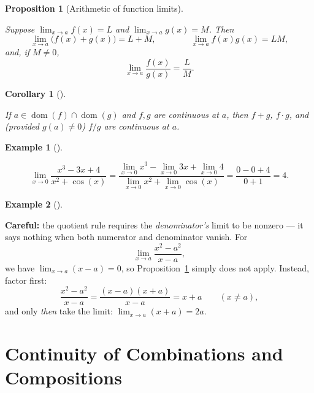 \documentclass[
  letterpaper,
  DIV=11,
  numbers=noendperiod]{scrreprt}
\theoremstyle{plain}
\theoremstyle{plain}
\newtheorem{proposition}{Proposition}[chapter]
\theoremstyle{definition}
\theoremstyle{definition}
\theoremstyle{definition}
\newtheorem{example}{Example}[chapter]
\theoremstyle{plain}
\theoremstyle{plain}
\newtheorem{corollary}{Corollary}[chapter]
\theoremstyle{remark}
\begin{document}
\begin{proposition}[Arithmetic of function
limits]\protect\hypertarget{prp-function-limit-laws}{}\label{prp-function-limit-laws}

Suppose \(\lim_{x\to a} f(x) = L\) and \(\lim_{x\to a} g(x) = M\). Then
\[
\lim_{x\to a} \big(f(x)+g(x)\big) = L+M, \qquad\qquad \lim_{x\to a} f(x)g(x) = LM,
\] and, if \(M\neq0\), \[
\lim_{x\to a} \frac{f(x)}{g(x)} = \frac{L}{M}.
\]

\end{proposition}

\begin{corollary}[]\protect\hypertarget{cor-continuity-algebra}{}\label{cor-continuity-algebra}

If \(a\in\operatorname{dom}(f)\cap\operatorname{dom}(g)\) and \(f,g\)
are continuous at \(a\), then \(f+g\), \(f\cdot g\), and (provided
\(g(a)\neq0\)) \(f/g\) are continuous at \(a\).

\end{corollary}

\begin{example}[]\protect\hypertarget{exm-rational-function-limit}{}\label{exm-rational-function-limit}

\hfill\break
\[
\lim_{x\to 0} \frac{x^3-3x+4}{x^2+\cos(x)}
= \frac{\lim_{x\to0}x^3 - \lim_{x\to0}3x + \lim_{x\to0}4}{\lim_{x\to0}x^2 + \lim_{x\to0}\cos(x)}
= \frac{0-0+4}{0+1} = 4.
\]

\end{example}

\begin{example}[]\protect\hypertarget{exm-quotient-careful}{}\label{exm-quotient-careful}

\hfill\break
\textbf{Careful:} the quotient rule requires the \emph{denominator's}
limit to be nonzero --- it says nothing when both numerator and
denominator vanish. For \[
\lim_{x\to a} \frac{x^2-a^2}{x-a},
\] we have \(\lim_{x\to a}(x-a) = 0\), so
Proposition~\ref{prp-function-limit-laws} simply does not apply.
Instead, factor first: \[
\frac{x^2-a^2}{x-a} = \frac{(x-a)(x+a)}{x-a} = x+a \qquad (x\neq a),
\] and only \emph{then} take the limit: \(\lim_{x\to a}(x+a) = 2a\).

\end{example}

\section{Continuity of Combinations and
Compositions}\label{continuity-of-combinations-and-compositions}
\end{document}
